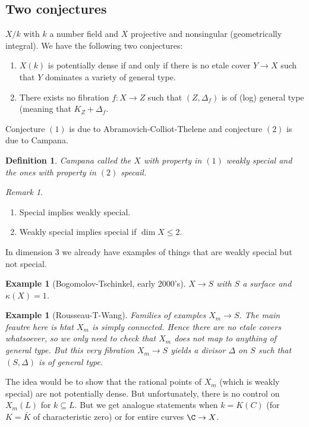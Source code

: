 \documentclass[A4paper, british]{amsart}
\theoremstyle{darkgreentheorem}
\theoremstyle{darkbluedefinition}
\newtheorem{defn}[thm]{Definition}
\theoremstyle{darkredexample}
\newtheorem{exa}[thm]{Example}
\theoremstyle{remark}
\newtheorem{rem}[thm]{Remark}
\newcommand{\1}{\mathbbm{1}}
\newcommand{\sub}{\subseteq}
\begin{document}
\subsection{Two conjectures}

$X/k$ with $k$ a number field and $X$ projective and nonsingular (geometrically integral).
We have the following two conjectures:

\begin{enumerate}
    \item $X(k)$ is potentially dense if and only if there is no etale cover $Y\to X$ such that $Y$ dominates a variety of general type.
    \item There exists no fibration $f\colon X\to Z$ such that $(Z,\Delta_{f})$ is of (log) general type (meaning that $K_{Z}+\Delta_{f}$.
\end{enumerate}

Conjecture $(1)$ is due to Abramovich-Colliot-Thelene and conjecture $(2)$ is due to Campana.

\begin{defn}
    Campana called the $X$ with property in $(1)$ \textit{weakly special} and the ones with property in $(2)$ \textit{specail}.
\end{defn}

\begin{rem}
    \begin{enumerate}
	\item Special implies weakly special.
	\item Weakly special implies special  if $\dim{X}\leqslant 2$.
    \end{enumerate}
\end{rem}

In dimension $3$ we already have examples of things that are weakly special but not special.
\begin{exa}[Bogomolov-Tschinkel, early 2000's]
    $X\to S$ with $S$ a surface and $\kappa(X)=1$.
\end{exa}

\begin{exa}[Rousseau-T-Wang]
    Families of examples $X_{m}\to S$.
    The main feautre here is htat $X_{m}$ is simply connected.
    Hence there are no etale covers whatsoever, so we only need to check that $X_{m}$ does not map to anything of general type.
    But this very fibration $X_{m}\to S$ yields a divisor $\Delta$ on $S$ such that $(S,\Delta)$ is of general type.
\end{exa}

The idea would be to show that the rational points of $X_{m}$ (which is weakly special) are not potentially dense.
But unfortunately, there is no control on $X_{m}(L)$ for $k\sub L$.
But we get analogue statements when $k=K(C)$ (for $K=\bar{K}$ of characteristic zero) or for entire curves $\C\to X$.
\end{document}
